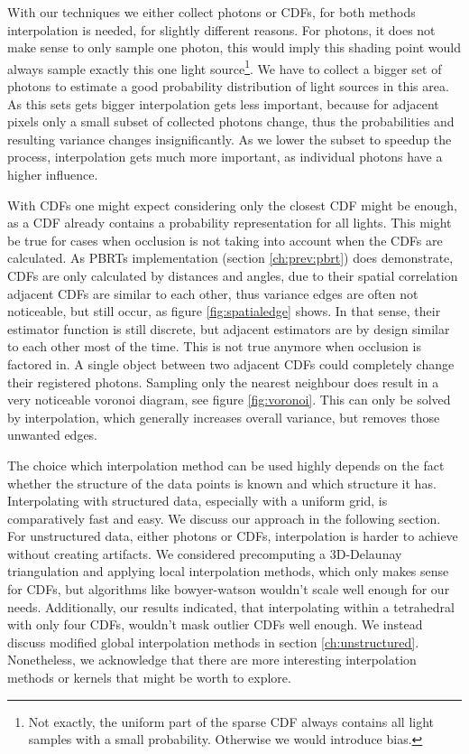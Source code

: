 With our techniques we either collect photons or CDFs, for both methods interpolation is needed, for slightly different reasons. For photons, it does not make sense to only sample one photon, this would imply this shading point would always sample exactly this one light source\footnote{Not exactly, the uniform part of the sparse CDF always contains all light samples with a small probability. Otherwise we would introduce bias.}. We have to collect a bigger set of photons to estimate a good probability distribution of light sources in this area. As this sets gets bigger interpolation gets less important, because for adjacent pixels only a small subset of collected photons change, thus the probabilities and resulting variance changes insignificantly. As we lower the subset to speedup the process, interpolation gets much more important, as individual photons have a higher influence.

With CDFs one might expect considering only the closest CDF might be enough, as a CDF already contains a probability representation for all lights. This might be true for cases when occlusion is not taking into account when the CDFs are calculated. As PBRTs implementation (section \ref{ch:prev:pbrt}) does demonstrate, CDFs are only calculated by distances and angles, due to their spatial correlation adjacent CDFs are similar to each other, thus variance edges are often not noticeable, but still occur, as figure \ref{fig:spatialedge} shows. In that sense, their estimator function is still discrete, but adjacent estimators are by design similar to each other most of the time. This is not true anymore when occlusion is factored in. A single object between two adjacent CDFs could completely change their registered photons. Sampling only the nearest neighbour does result in a very noticeable voronoi diagram, see figure \ref{fig:voronoi}. This can only be solved by interpolation, which generally increases overall variance, but removes those unwanted edges.

The choice which interpolation method can be used highly depends on the fact whether the structure of the data points is known and which structure it has. Interpolating with structured data, especially with a uniform grid, is comparatively fast and easy. We discuss our approach in the following section. For unstructured data, either photons or CDFs, interpolation is harder to achieve without creating artifacts. We considered precomputing a 3D-Delaunay triangulation and applying local interpolation methods, which only makes sense for CDFs, but algorithms like bowyer-watson wouldn't scale well enough for our needs. Additionally, our results indicated, that interpolating within a tetrahedral with only four CDFs, wouldn't mask outlier CDFs well enough. We instead discuss modified global interpolation methods in section \ref{ch:unstructured}. Nonetheless, we acknowledge that there are more interesting interpolation methods or kernels that might be worth to explore.

